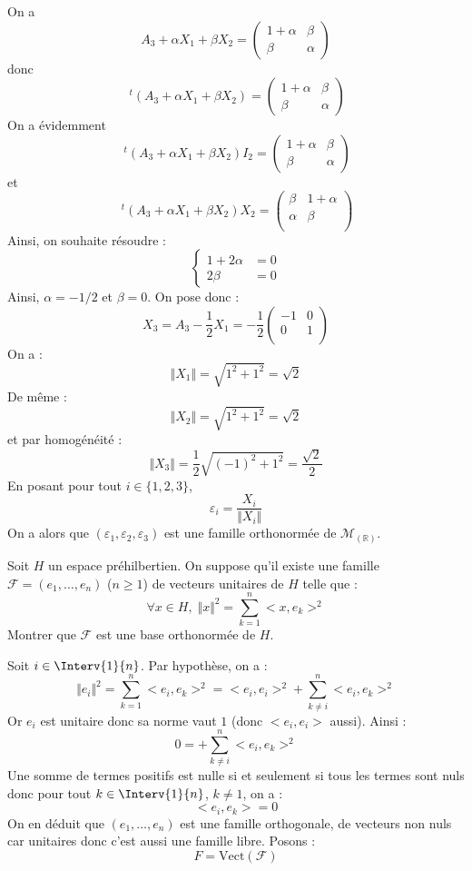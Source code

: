 \documentclass[a4paper,10pt]{report}
\begin{document}
On a 
$$ A_3+ \alpha X_1+ \beta X_2 = \begin{pmatrix}
1 + \alpha & \beta \\
\beta & \alpha
\end{pmatrix}$$
donc
$$ ~^t(A_3+ \alpha X_1+ \beta X_2)= \begin{pmatrix}
1 + \alpha & \beta \\
\beta & \alpha
\end{pmatrix}$$
On a évidemment
$$ ~^t(A_3+ \alpha X_1+ \beta X_2) I_2= \begin{pmatrix}
1 + \alpha & \beta \\
\beta & \alpha
\end{pmatrix}$$
et 
$$ ~^t(A_3+ \alpha X_1+ \beta X_2) X_2 = \begin{pmatrix}
\beta & 1 + \alpha \\
\alpha& \beta \\
\end{pmatrix}$$
Ainsi, on souhaite résoudre :
$$ \left\lbrace \begin{array}{rl}
1+ 2 \alpha & = 0 \\
2 \beta & = 0 
\end{array}\right.$$
Ainsi, $\alpha=-1/2$ et $\beta=0$.
On pose donc :
$$ X_3 = A_3 - \dfrac{1}{2} X_1 = -\dfrac{1}{2} \begin{pmatrix}
-1 & 0 \\
0 & 1 \\
\end{pmatrix}$$
On a :
$$ \Vert X_1 \Vert = \sqrt{1^2+1^2} = \sqrt{2}$$
De même :
$$ \Vert X_2 \Vert = \sqrt{1^2+1^2} = \sqrt{2}$$
et par homogénéité :
$$ \Vert X_3 \Vert = \dfrac{1}{2} \sqrt{(-1)^2+1^2} = \dfrac{\sqrt{2}}{2}$$
En posant pour tout $i \in \lbrace 1,2,3 \rbrace$,
$$ \varepsilon_i = \dfrac{X_i}{\Vert X_i \Vert}$$
On a alors que $(\varepsilon_1, \varepsilon_2, \varepsilon_3)$ est une famille orthonormée de $\mathcal{M}_(\mathbb{R})$.

\begin{Exercice}{} Soit $H$ un espace préhilbertien. On suppose qu'il existe une famille $\mathcal{F}=(e_1, \ldots, e_n)$ ($n \geq 1$) de vecteurs unitaires de $H$ telle que :
$$ \forall x \in H, \; \Vert x \Vert^2= \sum_{k=1}^n <x,e_k>^2 $$
Montrer que $\mathcal{F}$ est une base orthonormée de $H$.
\end{Exercice}

\corr Soit $i \in \Interv{1}{n}$. Par hypothèse, on a :
$$ \Vert e_i \Vert^2= \sum_{k=1}^n <e_i,e_k>^2 = <e_i,e_i>^2 + \sum_{k \neq i}^n <e_i,e_k>^2 $$
Or $e_i$ est unitaire donc sa norme vaut $1$ (donc $<e_i,e_i>$ aussi). Ainsi :
$$ 0 = + \sum_{k \neq i}^n <e_i,e_k>^2 $$
Une somme de termes positifs est nulle si et seulement si tous les termes sont nuls donc pour tout $k \in \Interv{1}{n}$, $k \neq 1$, on a :
$$<e_i,e_k>=0$$
On en déduit que $(e_1, \ldots, e_n)$ est une famille orthogonale, de vecteurs non nuls car unitaires donc c'est aussi une famille libre. Posons :
$$ F = \textrm{Vect}(\mathcal{F})$$
\end{document}
